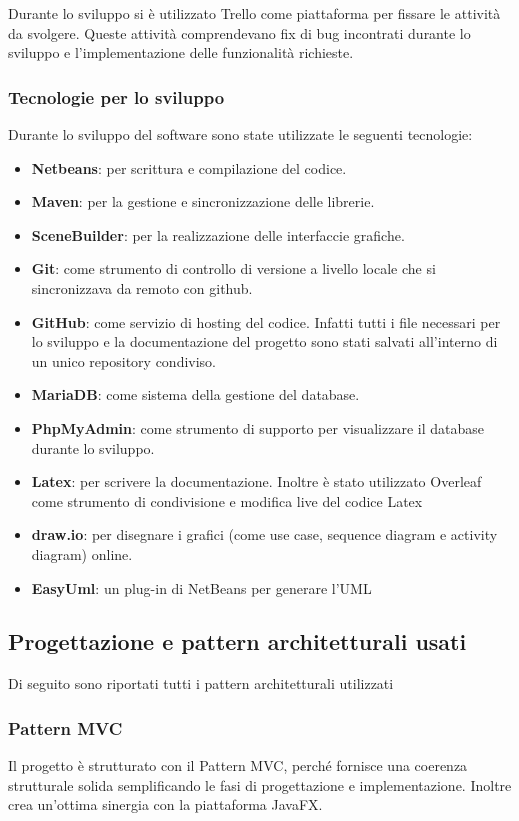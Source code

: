 \documentclass{article}
\begin{document}
Durante lo sviluppo si è utilizzato Trello come piattaforma per fissare le attività da svolgere. Queste attività comprendevano fix di bug incontrati durante lo sviluppo e l'implementazione delle funzionalità richieste. 
\subsubsection{Tecnologie per lo sviluppo}
Durante lo sviluppo del software sono state utilizzate le seguenti tecnologie:
\begin{itemize}
    \item{\textbf{Netbeans}: per scrittura e compilazione del codice.}
    \item{\textbf{Maven}: per la gestione e sincronizzazione delle librerie.}
    \item{\textbf{SceneBuilder}: per la realizzazione delle interfaccie grafiche.}
    \item{\textbf{Git}: come strumento di controllo di versione a livello locale che si sincronizzava da remoto con github. }
    \item{\textbf{GitHub}: come servizio di hosting del codice. Infatti tutti i file necessari per lo sviluppo e la documentazione del progetto sono stati salvati all'interno di un unico repository condiviso.}
    \item{\textbf{MariaDB}: come sistema della gestione del database.}
    \item{\textbf{PhpMyAdmin}: come strumento di supporto per visualizzare il database durante lo sviluppo.}
    \item{\textbf{Latex}: per scrivere la documentazione. Inoltre è stato utilizzato Overleaf come strumento di condivisione e modifica live del codice Latex}

    \item{\textbf{draw.io}: per disegnare  i grafici (come use case, sequence diagram e activity diagram) online. }
    \item{\textbf{EasyUml}: un plug-in di NetBeans per generare l'UML}
\end{itemize}

\subsection{Progettazione e pattern architetturali usati}
Di seguito sono riportati tutti i pattern architetturali utilizzati 
\subsubsection{Pattern MVC}
Il progetto è strutturato con il Pattern MVC, perché fornisce una coerenza strutturale solida 
semplificando le fasi di progettazione e implementazione. Inoltre crea un'ottima sinergia con la
piattaforma JavaFX.
\end{document}
